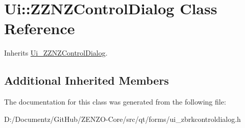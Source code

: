 \hypertarget{class_ui_1_1_z_z_n_z_control_dialog}{}\section{Ui\+::Z\+Z\+N\+Z\+Control\+Dialog Class Reference}
\label{class_ui_1_1_z_z_n_z_control_dialog}


Inherits \mbox{\hyperlink{class_ui___z_z_n_z_control_dialog}{Ui\+\_\+\+Z\+Z\+N\+Z\+Control\+Dialog}}.

\subsection*{Additional Inherited Members}


The documentation for this class was generated from the following file\+:\begin{DoxyCompactItemize}
\item 
D\+:/\+Documentz/\+Git\+Hub/\+Z\+E\+N\+Z\+O-\/\+Core/src/qt/forms/ui\+\_\+zbrkcontroldialog.\+h\end{DoxyCompactItemize}
